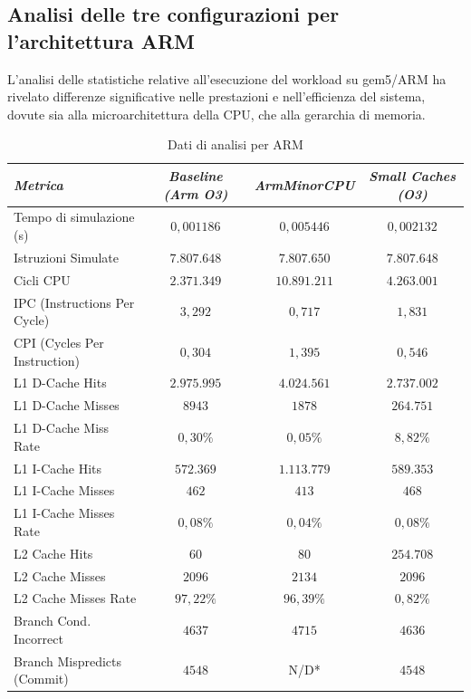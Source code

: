 \documentclass[../../main_document/main.tex]{subfiles}
\begin{document}
\subsection{Analisi delle tre configurazioni per l'architettura ARM}
L’analisi delle statistiche relative all’esecuzione del workload su gem5/ARM ha rivelato differenze significative nelle prestazioni e nell’efficienza del sistema, dovute sia alla microarchitettura della CPU,
che alla gerarchia di memoria.
\begin{table}[tbh] %
    \begin{center}
        \begin{tabular}{|l|c|c|c|}
            \hline
            \textit{Metrica} & \textit{Baseline (Arm O3)} & \textit{ArmMinorCPU} & \textit{Small Caches (O3)}\\
            \hline
            Tempo di simulazione (s) & $0,001186$ & 0$,005446$ & $0,002132$ \\
            Istruzioni Simulate & $7.807.648$ & $7.807.650$ & $7.807.648$ \\
            Cicli CPU & $2.371.349$ & $10.891.211$ & $4.263.001$ \\
            IPC (Instructions Per Cycle) & $3,292$ & $0,717$ & $1,831$ \\
            CPI (Cycles Per Instruction) & $0,304$ & $1,395$ & $0,546$ \\
            L1 D-Cache Hits & $2.975.995$ & $4.024.561$ & $2.737.002$ \\
            L1 D-Cache Misses & $8943$ & $1878$ & $264.751$ \\
            L1 D-Cache Miss Rate & $0,30\%$ & $0,05\%$ & $8,82\%$ \\
            L1 I-Cache Hits & $572.369$ & $1.113.779$ & $589.353$ \\
            L1 I-Cache Misses & $462$ & $413$ & $468$ \\
            L1 I-Cache Misses Rate & $0,08\%$ & $0,04\%$ & $0,08\%$ \\
            L2 Cache Hits & $60$ & $80$ & $254.708$ \\ 
            L2 Cache Misses & $2096$ & $2134$ & $2096$ \\
            L2 Cache Misses Rate & $97,22\%$ & $96,39\% $& $0,82\%$ \\
            Branch Cond. Incorrect & $4637$ & $4715$ & $4636$ \\
            Branch Mispredicts (Commit) & $4548$ & N/D* & $4548$ \\
            \hline
        \end{tabular}
        \caption{Dati di analisi per ARM}
        \label{tab: tab_1}
    \end{center}
\end{table}
\end{document}
